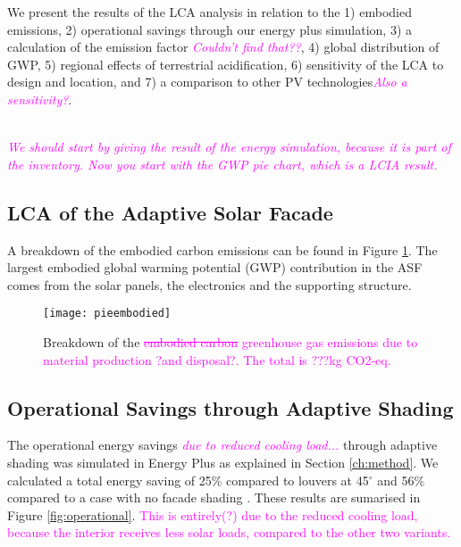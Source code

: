 
We present the results of the LCA analysis in relation to the 1) embodied emissions, 2) operational savings through our energy plus simulation, 3) a calculation of the emission factor \textcolor{magenta}{\textit{Couldn't find that??}}, 4) global distribution of GWP, 5) regional effects of terrestrial acidification, 6) sensitivity of the LCA to design and location, and 7) a comparison to other PV technologies\textcolor{magenta}{\textit{Also a sensitivity?}}.

\textcolor{magenta}{\textit{\\We should start by giving the result of the energy simulation, because it is part of the inventory. Now you start with the GWP pie chart, which is a LCIA result.}}

\subsection{LCA of the Adaptive Solar Facade}

A breakdown of the embodied carbon emissions can be found in Figure  \ref{fig:embodied}. The largest embodied global warming potential (GWP) contribution in the ASF comes from the solar panels, the electronics and the supporting structure.

\begin{figure}[H]
\begin{center}
\texttt{[image: pieembodied]}
\caption{Breakdown of the \textcolor{magenta}{\sout{embodied carbon} greenhouse gas emissions due to material production ?and disposal?. The total is  ???kg CO2-eq.}}
\label{fig:embodied}
\end{center}
\end{figure}

\subsection{Operational Savings through Adaptive Shading}
\label{ch:oppResults}

The operational energy savings \textcolor{magenta}{\textit{due to reduced cooling load...}} through adaptive shading was simulated in Energy Plus as explained in Section \ref{ch:method}. We calculated a total energy saving of 25\% compared to louvers at 45$^\circ$ and 56\% compared to a case with no facade shading \cite{jayathissa2015abs}. These results are sumarised in Figure \ref{fig:operational}. \textcolor{magenta}{This is entirely(?) due to the reduced cooling load, because the interior receives less solar loads, compared to the other two variants.}

